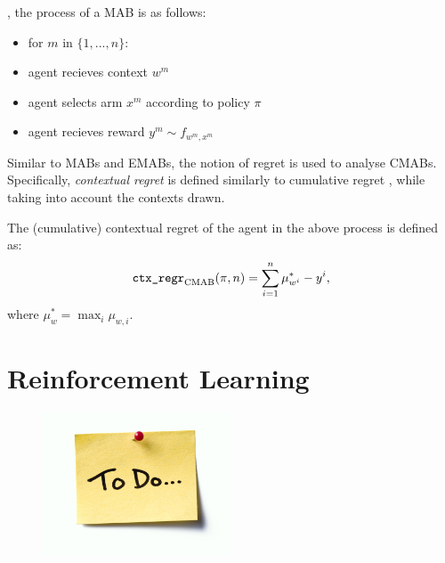         , the process of a MAB is as follows:
        \begin{itemize}
            \item for $m$ in $\{1,...,n\}$:
            \item agent recieves context $w^m$
            \item agent selects arm $x^m$ according to policy $\pi$
            \item agent recieves reward $y^m \sim f_{w^m,x^m}$
        \end{itemize}

        Similar to MABs and EMABs, the notion of regret is used to analyse CMABs. Specifically, \textit{contextual regret} is defined similarly to cumulative regret , while taking into account the contexts drawn.

        \begin{defn}
            The \textnormal{(cumulative) contextual regret} of the agent in the above process is defined as:
            \begin{align}
                {\textnormal{\texttt{ctx\_regr}}}_{{\textnormal{CMAB}}}(\pi,n) = \sum_{i=1}^n \mu_{w^i}^* - y^i,
            \end{align}
            where $\mu_{w}^* = \max_i \mu_{w,i}$.
        \end{defn}












\section{Reinforcement Learning}
\label{sec:2-3-rl}



    \begin{figure}
        \label{fig:rl_overview}
        \centering\includegraphics[width=0.5\textwidth]{figures/todo.jpg} 
        \caption[todo]{}
    \end{figure}


